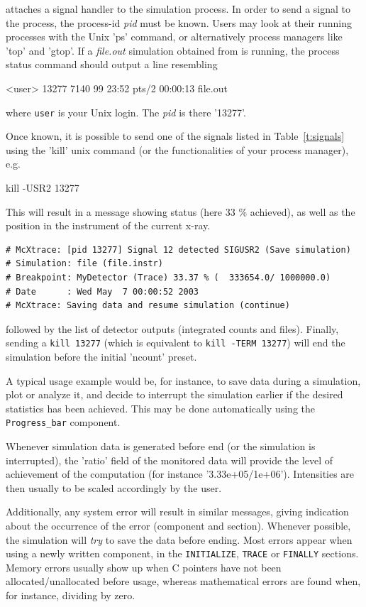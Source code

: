 \MCX attaches a signal handler to the simulation process. In order to send a signal to the process, the process-id \textit{pid} must be known. Users may look at their running processes with the Unix 'ps' command, or alternatively process managers like 'top' and 'gtop'.
If a \textit{file.out} simulation obtained from \MCX is running, the process status command should output a line resembling

\begin{bash}
<user> 13277 7140 99 23:52 pts/2   00:00:13   file.out
\end{bash}

where \verb+user+ is your Unix login. The \textit{pid} is there '13277'.

Once known, it is possible to send one of the signals listed in Table~\ref{t:signals} using the 'kill' unix command (or the functionalities of your process manager), e.g.
\begin{bash}
    kill -USR2 13277
\end{bash}

This will result in a message showing status (here 33 \% achieved), as well as the position in the instrument of the current x-ray.
\begin{lstlisting}
# McXtrace: [pid 13277] Signal 12 detected SIGUSR2 (Save simulation)
# Simulation: file (file.instr)
# Breakpoint: MyDetector (Trace) 33.37 % (  333654.0/ 1000000.0)
# Date      : Wed May  7 00:00:52 2003
# McXtrace: Saving data and resume simulation (continue)
\end{lstlisting}
followed by the list of detector outputs (integrated counts and files). Finally, sending a \verb+kill 13277+ (which is equivalent to \verb+kill -TERM 13277+) will end the simulation before the initial 'ncount' preset.

A typical usage example would be, for instance, to save data during a
simulation, plot or analyze it, and decide to interrupt the simulation earlier
if the desired statistics has been achieved. This may be done automatically
using the \verb+Progress_bar+ component.

Whenever simulation data is generated before end (or the simulation is
interrupted), the 'ratio' field of the monitored data will provide the level of
achievement of the computation (for instance '3.33e+05/1e+06'). Intensities are
then usually to be scaled accordingly by the user.

Additionally, any system error will result in similar messages, giving
indication about the occurrence of the error (component and section). Whenever
possible, the simulation will {\em try} to save the data before ending. Most
errors appear when using a newly written component, in the \texttt{INITIALIZE},
\texttt{TRACE} or \texttt{FINALLY} sections. Memory errors usually show up when
C pointers have not been allocated/unallocated before usage, whereas
mathematical errors are found when, for instance, dividing by zero.

